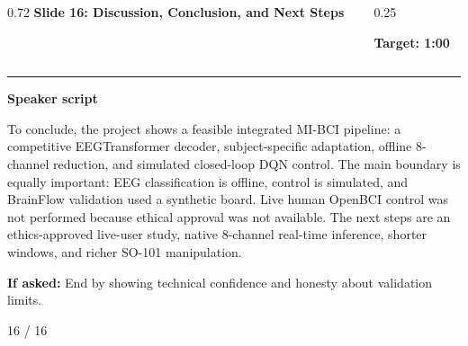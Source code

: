 \documentclass[aspectratio=169,10pt]{beamer}
\begin{document}
\begin{frame}[plain]
\vspace*{0.16cm}
\begin{columns}[T,totalwidth=\textwidth]
\begin{column}{0.72\textwidth}
{\fontsize{17}{18.5}\selectfont\bfseries Slide 16: Discussion, Conclusion, and Next Steps}
\end{column}
\begin{column}{0.25\textwidth}
\raggedleft
\colorbox{noteCream}{\parbox{0.88\linewidth}{\centering\bfseries Target: 1:00}}
\end{column}
\end{columns}
\vspace{0.10cm}
{\color{uomPurple}\rule{\textwidth}{1.2pt}}
\vspace{0.18cm}
{\color{uomPurple}\bfseries Speaker script}
\vspace{0.06cm}
\setlength{\fboxsep}{6pt}
\noindent\colorbox{panelGrey}{\begin{minipage}{0.94\textwidth}
\justifying\fontsize{11.0}{13.4}\selectfont
To conclude, the project shows a feasible integrated MI-BCI pipeline: a competitive EEGTransformer decoder, subject-specific adaptation, offline 8-channel reduction, and simulated closed-loop DQN control. The main boundary is equally important: EEG classification is offline, control is simulated, and BrainFlow validation used a synthetic board. Live human OpenBCI control was not performed because ethical approval was not available. The next steps are an ethics-approved live-user study, native 8-channel real-time inference, shorter windows, and richer SO-101 manipulation.
\end{minipage}}
\vspace{0.22cm}
\noindent\colorbox{noteCream}{\begin{minipage}{0.94\textwidth}
\fontsize{9.6}{11.6}\selectfont
{\bfseries If asked:} End by showing technical confidence and honesty about validation limits.
\end{minipage}}
\vfill
\hfill{\color{textDark}\scriptsize 16 / 16}
\end{frame}
\end{document}
